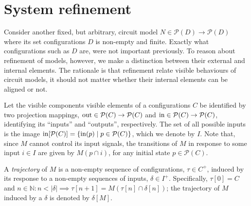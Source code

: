 \section{System refinement}

Consider another fixed, but arbitrary, circuit model $N \in \mathcal{P}(D) \rightarrow \mathcal{P}(D)$ where its set configurations $D$ is non-empty and finite. Exactly what configurations such as $D$ are, were not important previously. To reason about refinement of models, however, we make a distinction between their external and internal elements. The rationale is that refinement relate visible behaviours of circuit models, it should not matter whether their internal elements can be aligned or not.

Let the visible components visible elements of a configurations $C$ be identified by two projection mappings, $\operatorname{out} \in \mathcal{P}(C) \rightarrow \mathcal{P}(C)$ and $\operatorname{in} \in \mathcal{P}(C) \rightarrow \mathcal{P}(C)$, identifying its ``inputs'' and ``outputs'', respectively. The set of all possible inputs is the image $\operatorname{in}[\mathcal{P}(C)] = \{ \operatorname{in}(p) \mid p \in \mathcal{P}(C) \}$, which we denote by $I$. Note that, since $M$ cannot control its input signals, the transitions of $M$ in response to some input $i \in I$ are given by $M(p \cap i)$, for any initial state $p \in \mathcal{P}(C)$.

A \textit{trajectory} of $M$ is a non-empty sequence of configurations, $\tau \in C^{+}$, induced by its response to a non-empty sequences of inputs, $\delta \in I^{+}$. Specifically, $\tau[0] = C$ and $n \in \mathbb{N} : n < | \delta | \implies \tau[n+1] = M(\tau[n] \cap \delta[n])$; the trajectory of $M$ induced by a $\delta$ is denoted by $\delta[M]$.
